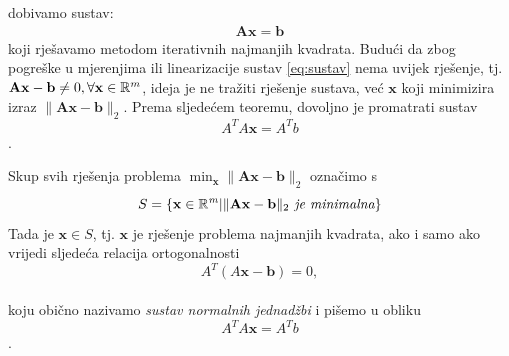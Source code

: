 \documentclass[a4paper,twoside,12pt]{memoir} %
\begin{document}
dobivamo sustav:
\begin{align}\label{eq:sustav}
\mathbf{A}\mathbf{x} = \mathbf{b}
\end{align}
koji rješavamo metodom iterativnih najmanjih kvadrata.\label{stranica:nastavakLS}
Budući da zbog pogreške u mjerenjima ili linearizacije sustav \ref{eq:sustav} nema uvijek rješenje, tj. 
$\mathbf{A}\mathbf{x} - \mathbf{b} \not = 0, \forall \mathbf{x} \in \mathbb{R}^m$,
ideja je ne tražiti rješenje sustava, već $\mathbf{x}$ koji minimizira izraz $\|\mathbf{A}\mathbf{x} - \mathbf{b}\|_2$.
Prema sljedećem teoremu, dovoljno je promatrati sustav
$$ A^TA\mathbf{x} = A^Tb $$.

\begin{thm}
	Skup svih rješenja problema $\min_\mathbf{x}\| \mathbf{A}\mathbf{x} - \mathbf{b} \|_2$ označimo s
	$$ S= \{\mathbf{x} \in \mathbb{R}^\mathit{m} | \| \mathbf{A}\mathbf{x} - \mathbf{b} \|_2 \textit{ je minimalna} \} $$
	Tada je $\mathbf{x}  \in S$, tj. $\mathbf{x}$ je rješenje problema najmanjih kvadrata, ako i samo ako vrijedi sljedeća relacija ortogonalnosti 
	$$A^T(A\mathbf{x}-\mathbf{b}) = 0,$$
	\\ koju obično nazivamo \textit{sustav normalnih jednadžbi} i pišemo u obliku 
	$$ A^TA\mathbf{x} = A^Tb $$.
\end{thm}
\end{document}
